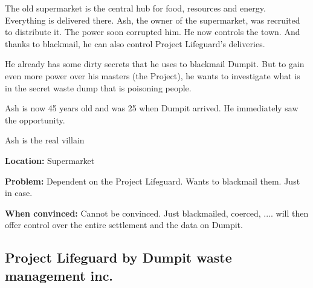 \begin{npcBox}[title=Ash]
    \begin{stressSection}
    \end{stressSection}
    \begin{tabularx}{\textwidth}{ XX }
    \end{tabularx}

    \begin{consequences}
    \item {}
    \item {}
    \item {}
    \end{consequences}

    \begin{npcDescription}
    The old supermarket is the central hub for food, resources and energy. Everything is delivered there. Ash, the owner of the supermarket, was recruited to distribute it. The power soon corrupted him. He now controls the town. And thanks to blackmail, he can also control Project Lifeguard's deliveries.

    He already has some dirty secrets that he uses to blackmail Dumpit. But to gain even more power over his masters (the Project), he wants to investigate what is in the secret waste dump that is poisoning people.

    Ash is now 45 years old and was 25 when Dumpit arrived. He immediately saw the opportunity.

    Ash is the real villain

    \textbf{Location:} Supermarket

    \textbf{Problem:} Dependent on the Project Lifeguard. Wants to blackmail them. Just in case.

    \textbf{When convinced:} Cannot be convinced. Just blackmailed, coerced, .... will then offer control over the entire settlement and the data on Dumpit.
    \end{npcDescription}

\end{npcBox}




\subsection{Project Lifeguard by Dumpit waste management inc.}

